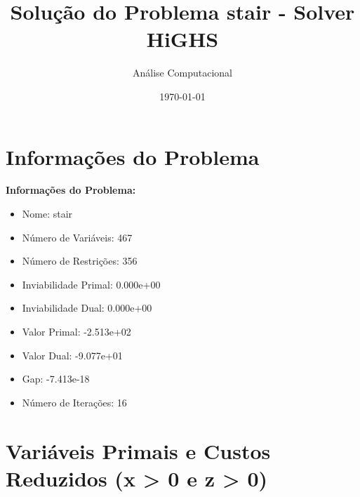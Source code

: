 \documentclass[12pt]{article}
\title{Solução do Problema stair - Solver HiGHS}
\author{Análise Computacional}
\date{\today}
\begin{document}
\maketitle

\section{Informações do Problema}

\textbf{Informações do Problema:}
\begin{itemize}
\item Nome: stair
\item Número de Variáveis: 467
\item Número de Restrições: 356
\item Inviabilidade Primal: 0.000e+00
\item Inviabilidade Dual: 0.000e+00
\item Valor Primal: -2.513e+02
\item Valor Dual: -9.077e+01
\item Gap: -7.413e-18
\item Número de Iterações: 16
\end{itemize}


\section{Variáveis Primais e Custos Reduzidos (x > 0 e z > 0)}
\end{document}
